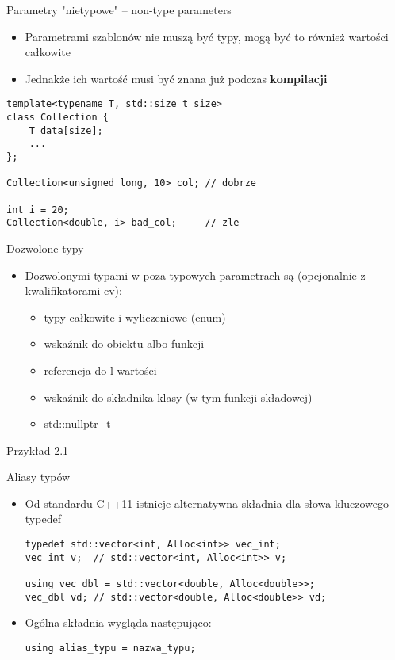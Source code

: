 \documentclass[11pt]{beamer}
\begin{document}
\begin{frame}[fragile]{Parametry "nietypowe" -- non-type parameters}
    \begin{itemize}
        \item Parametrami szablonów nie muszą być typy, mogą być to również wartości całkowite
        \item Jednakże ich wartość musi być znana już podczas \textbf{kompilacji}
    \end{itemize}
    \begin{lstlisting}[frame=single]
template<typename T, std::size_t size>
class Collection {
    T data[size];
    ...
};

Collection<unsigned long, 10> col; // dobrze

int i = 20;
Collection<double, i> bad_col;     // zle
    \end{lstlisting}
\end{frame}

\begin{frame}[fragile]{Dozwolone typy}
    \begin{itemize}
        \item Dozwolonymi typami w poza-typowych parametrach są (opcjonalnie z kwalifikatorami cv):
        \begin{itemize}
            \item typy całkowite i wyliczeniowe (enum)
            \item wskaźnik do obiektu albo funkcji
            \item referencja do l-wartości
            \item wskaźnik do składnika klasy (w tym funkcji składowej)
            \item std::nullptr\_t
        \end{itemize}
    \end{itemize}
    \alert{Przykład 2.1}
\end{frame}

\begin{frame}[fragile]{Aliasy typów}
    \begin{itemize}
        \item Od standardu C++11 istnieje alternatywna składnia dla słowa kluczowego typedef
    \begin{lstlisting}[frame=single]
typedef std::vector<int, Alloc<int>> vec_int;
vec_int v;  // std::vector<int, Alloc<int>> v;

using vec_dbl = std::vector<double, Alloc<double>>;
vec_dbl vd; // std::vector<double, Alloc<double>> vd;
    \end{lstlisting}
        \item Ogólna składnia wygląda następująco:
\begin{lstlisting}[frame=single]
using alias_typu = nazwa_typu;
    \end{lstlisting}
    
    \end{itemize}
\end{frame}
\end{document}
